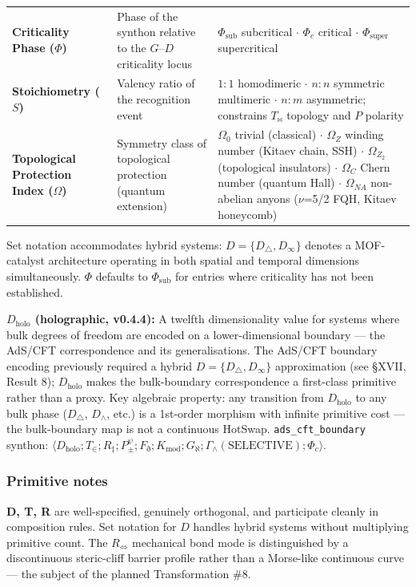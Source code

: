 \documentclass[12pt,a4paper]{article}
\begin{document}
\begin{table}[htbp]
\begin{tabularx}{\textwidth}{>{\centering\arraybackslash}X >{\centering\arraybackslash}X >{\centering\arraybackslash}X}
\textbf{Criticality Phase ($\Phi$)} & Phase of the synthon relative to the $G$--$D$ criticality locus & $\Phi_{\text{sub}}$ subcritical $\cdot$ $\Phi_c$ critical $\cdot$ $\Phi_{\text{super}}$ supercritical \\
\textbf{Stoichiometry ($S$)} & Valency ratio of the recognition event & $1:1$ homodimeric $\cdot$ $n:n$ symmetric multimeric $\cdot$ $n:m$ asymmetric; constrains $T_{\bowtie}$ topology and $P$ polarity \\
\textbf{Topological Protection Index ($\Omega$)} & Symmetry class of topological protection (quantum extension) & $\Omega_0$ trivial (classical) $\cdot$ $\Omega_Z$ winding number (Kitaev chain, SSH) $\cdot$ $\Omega_{Z_2}$ (topological insulators) $\cdot$ $\Omega_C$ Chern number (quantum Hall) $\cdot$ \textbf{$\Omega_{NA}$} non-abelian anyons ($\nu$=5/2 FQH, Kitaev honeycomb) \\
\bottomrule
\end{tabularx}
\end{table}

Set notation accommodates hybrid systems: $D = \{D_{\bigtriangleup}, D_{\infty}\}$ denotes a MOF-catalyst architecture operating in both spatial and temporal dimensions simultaneously. $\Phi$ defaults to $\Phi_{\text{sub}}$ for entries where criticality has not been established.

\textbf{$D_{\text{holo}}$ (holographic, v0.4.4):} A twelfth dimensionality value for systems where bulk degrees of freedom are encoded on a lower-dimensional boundary --- the AdS/CFT correspondence and its generalisations. The AdS/CFT boundary encoding previously required a hybrid $D = \{D_{\bigtriangleup}, D_{\infty}\}$ approximation (see §XVII, Result 8); $D_{\text{holo}}$ makes the bulk-boundary correspondence a first-class primitive rather than a proxy. Key algebraic property: any transition from $D_{\text{holo}}$ to any bulk phase ($D_{\bigtriangleup}$, $D_{\wedge}$, etc.) is a 1st-order morphism with infinite primitive cost --- the bulk-boundary map is not a continuous HotSwap. \texttt{ads\_cft\_boundary} synthon: $\langle D_{\text{holo}}; T_{\in}; R_{\ddagger}; P_{\pm}^{\psi}; F_{\eth}; K_{\text{mod}}; G_{\aleph}; \Gamma_{\wedge}(\text{SELECTIVE}); \Phi_c \rangle$.

\subsubsection{Primitive notes}

\textbf{D, T, R} are well-specified, genuinely orthogonal, and participate cleanly in composition rules. Set notation for $D$ handles hybrid systems without multiplying primitive count. The $R_{\Leftrightarrow}$ mechanical bond mode is distinguished by a discontinuous steric-cliff barrier profile rather than a Morse-like continuous curve --- the subject of the planned Transformation \#8.
\end{document}
